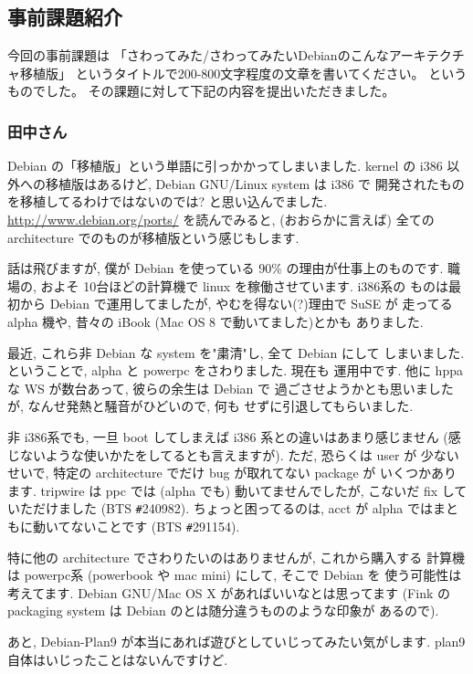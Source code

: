 \documentclass[mingoth]{jsarticle}
\begin{document}
\subsection{事前課題紹介}

今回の事前課題は
「さわってみた/さわってみたいDebianのこんなアーキテクチャ移植版」
というタイトルで200-800文字程度の文章を書いてください。
というものでした。
その課題に対して下記の内容を提出いただきました。

\subsubsection{田中さん}

Debian の「移植版」という単語に引っかかってしまいました. kernel の
i386 以外への移植版はあるけど, Debian GNU/Linux system は i386 で
開発されたものを移植してるわけではないのでは? と思い込んでました.
\url{http://www.debian.org/ports/} を読んでみると, (おおらかに言えば)
全ての architecture でのものが移植版という感じもします.

話は飛びますが, 僕が Debian を使っている 90\% の理由が仕事上のものです.
職場の, およそ 10台ほどの計算機で linux を稼働させています. i386系の
ものは最初から Debian で運用してましたが, やむを得ない(?)理由で SuSE が
走ってる alpha 機や, 昔々の iBook (Mac OS 8 で動いてました)とかも
ありました. 

最近, これら非 Debian な system を"粛清"し, 全て Debian にして
しまいました. ということで, alpha と powerpc をさわりました. 現在も
運用中です. 他に hppa な WS が数台あって, 彼らの余生は Debian で
過ごさせようかとも思いましたが, なんせ発熱と騒音がひどいので, 何も
せずに引退してもらいました.

非 i386系でも, 一旦 boot してしまえば i386 系との違いはあまり感じません 
(感じないような使いかたをしてるとも言えますが). ただ, 恐らくは user が
少ないせいで, 特定の architecture でだけ bug が取れてない package が
いくつかあります. tripwire は ppc では (alpha でも) 動いてませんでしたが, 
こないだ fix していただけました (BTS \verb!#!240982). ちょっと困ってるのは, 
acct が alpha ではまともに動いてないことです (BTS \verb!#!291154). 

特に他の architecture でさわりたいのはありませんが, これから購入する
計算機は powerpc系 (powerbook や mac mini) にして, そこで Debian を
使う可能性は考えてます. Debian GNU/Mac OS X があればいいなとは思ってます 
(Fink の packaging system は Debian のとは随分違うもののような印象が
あるので). 

あと, Debian-Plan9 が本当にあれば遊びとしていじってみたい気がします.
plan9 自体はいじったことはないんですけど.
\end{document}
